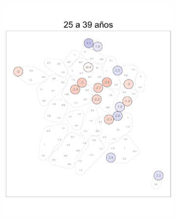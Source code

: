 \begin{figure}
\begin{subfigure}{0.3\textwidth}
	\includegraphics[width = \textwidth]{Figs/Efectos/Dorling_Efectos_Ed3_Modelo_H}
	\end{subfigure}
	~
	\begin{subfigure}{0.3\textwidth}

\end{subfigure}
\end{figure}
